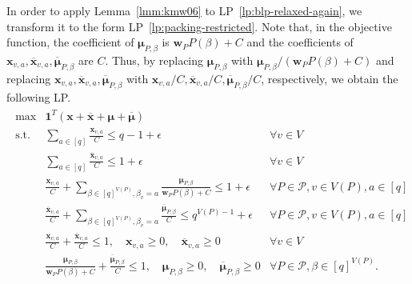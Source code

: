 \documentclass[letterpaper, 11pt]{article}
\newcommand{\calP}{\mathcal{P}}
\newcommand{\biw}{\boldsymbol{w}}
\newcommand{\bix}{\boldsymbol{x}}
\newcommand{\bimu}{\boldsymbol{\mu}}
\begin{document}
In order to apply Lemma~\ref{lmm:kmw06} to LP~\eqref{lp:blp-relaxed-again},
we transform it to the form LP~\eqref{lp:packing-restricted}.
Note that, in the objective function,
the coefficient of $\bimu_{P,\beta}$ is $\biw_PP(\beta)+C$ and the coefficients of $\bix_{v,a},\overline{\bix}_{v,a},\overline{\bimu}_{P,\beta}$ are $C$.
Thus, by replacing $\bimu_{P,\beta}$ with $\bimu_{P,\beta}/(\biw_PP(\beta)+C)$ and replacing $\bix_{v,a},\overline{\bix}_{v,a},\overline{\bimu}_{P,\beta}$ with $\bix_{v,a}/C,\overline{\bix}_{v,a}/C,\overline{\bimu}_{P,\beta}/C$, respectively, we obtain the following LP.
\begin{eqnarray*}
  \begin{array}{lll}
    \max & \mathbf{1}^T(\bix+\overline{\bix}+\bimu+\overline{\bimu}) \\
    \mbox{s.t.} & \sum\limits_{a\in[q]} \frac{\bix_{v,a}}{C} \leq q-1 + \epsilon & \forall v\in V\\    
    & \sum\limits_{a\in[q]}\frac{\overline{\bix}_{v,a}}{C} \leq 1+\epsilon & \forall v\in V\\    
    & \frac{\bix_{v,a}}{C}+\sum\limits_{\beta \in [q]^{V(P)}, \beta_v=a}\frac{\bimu_{P,\beta}}{\biw_PP(\beta)+C} \leq 1+\epsilon & \forall P\in \calP, v\in V(P), a\in [q]\\
    & \frac{\overline{\bix}_{v,a}}{C}+\sum\limits_{\beta \in [q]^{V(P)}, \beta_v=a}\frac{\overline{\bimu}_{P,\beta}}{C} \leq q^{V(P)-1}+\epsilon & \forall P\in \calP, v \in V(P), a\in [q]\\
    & \frac{\bix_{v,a}}{C}+\frac{\overline{\bix}_{v,a}}{C} \leq 1, \quad \bix_{v,a}\geq 0, \quad \overline{\bix}_{v,a}\geq 0 & \forall v \in V\\
    & \frac{\bimu_{P,\beta}}{\biw_PP(\beta)+C}+\frac{\overline{\bimu}_{P,\beta}}{C} \leq 1, \quad \bimu_{P,\beta}\geq 0, \quad \overline{\bimu}_{P,\beta}\geq 0 & \forall P\in \calP, \beta\in [q]^{V(P)}.\\
  \end{array}
\end{eqnarray*}
\end{document}
